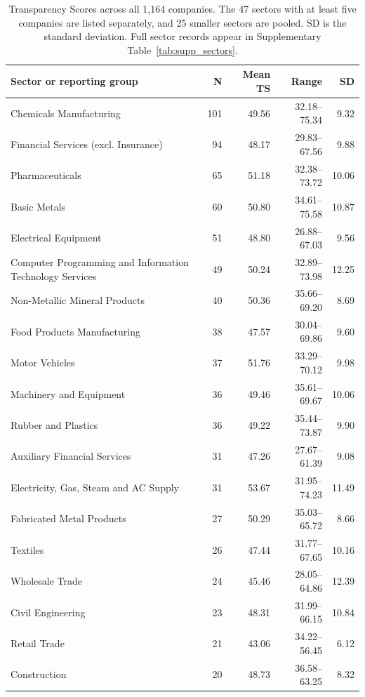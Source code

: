 \begin{table}[p]
\begin{singlepagetable}
\centering
\begingroup
\footnotesize
\setlength{\tabcolsep}{5pt}
\renewcommand{\arraystretch}{1.10}
\caption{Transparency Scores across all 1,164 companies. The 47 sectors with at least five companies are listed separately, and 25 smaller sectors are pooled. SD is the standard deviation. Full sector records appear in Supplementary Table~\ref{tab:supp_sectors}.}
\label{tab:all_sectors}
\begin{tabularx}{\linewidth}{@{}Yrrrr@{}}
\toprule\textbf{Sector or reporting group} & \textbf{N} & \textbf{Mean TS} & \textbf{Range} & \textbf{SD}\\\midrule
Chemicals Manufacturing & 101 & 49.56 & 32.18--75.34 & 9.32 \\
Financial Services (excl. Insurance) & 94 & 48.17 & 29.83--67.56 & 9.88 \\
Pharmaceuticals & 65 & 51.18 & 32.38--73.72 & 10.06 \\
Basic Metals & 60 & 50.80 & 34.61--75.58 & 10.87 \\
Electrical Equipment & 51 & 48.80 & 26.88--67.03 & 9.56 \\
Computer Programming and Information Technology Services & 49 & 50.24 & 32.89--73.98 & 12.25 \\
Non-Metallic Mineral Products & 40 & 50.36 & 35.66--69.20 & 8.69 \\
Food Products Manufacturing & 38 & 47.57 & 30.04--69.86 & 9.60 \\
Motor Vehicles & 37 & 51.76 & 33.29--70.12 & 9.98 \\
Machinery and Equipment & 36 & 49.46 & 35.61--69.67 & 10.06 \\
Rubber and Plastics & 36 & 49.22 & 35.44--73.87 & 9.90 \\
Auxiliary Financial Services & 31 & 47.26 & 27.67--61.39 & 9.08 \\
Electricity, Gas, Steam and AC Supply & 31 & 53.67 & 31.95--74.23 & 11.49 \\
Fabricated Metal Products & 27 & 50.29 & 35.03--65.72 & 8.66 \\
Textiles & 26 & 47.44 & 31.77--67.65 & 10.16 \\
Wholesale Trade & 24 & 45.46 & 28.05--64.86 & 12.39 \\
Civil Engineering & 23 & 48.31 & 31.99--66.15 & 10.84 \\
Retail Trade & 21 & 43.06 & 34.22--56.45 & 6.12 \\
Construction & 20 & 48.73 & 36.58--63.25 & 8.32 \\

\end{tabularx}
\end{singlepagetable}
\end{table}
